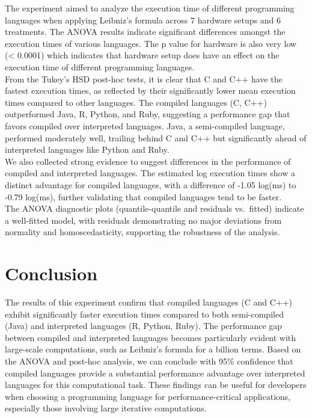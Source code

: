 \documentclass[12pt,halfline,a4paper,]{ouparticle}
\begin{document}
The experiment aimed to analyze the execution time of different
programming languages when applying Leibniz's formula across 7 hardware
setups and 6 treatments. The ANOVA results indicate significant
differences amongst the execution times of various languages. The p
value for hardware is also very low (\textless{} 0.0001) which indicates
that hardware setup does have an effect on the execution time of
different programming languages.\\
From the Tukey's HSD post-hoc tests, it is clear that C and C++ have the
fastest execution times, as reflected by their significantly lower mean
execution times compared to other languages. The compiled languages (C,
C++) outperformed Java, R, Python, and Ruby, suggesting a performance
gap that favors compiled over interpreted languages. Java, a
semi-compiled language, performed moderately well, trailing behind C and
C++ but significantly ahead of interpreted languages like Python and
Ruby.\\
We also collected strong evidence to suggest differences in the
performance of compiled and interpreted languages. The estimated log
execution times show a distinct advantage for compiled languages, with a
difference of -1.05 log(ms) to -0.79 log(ms), further validating that
compiled languages tend to be faster.\\
The ANOVA diagnostic plots (quantile-quantile and residuals vs.~fitted)
indicate a well-fitted model, with residuals demonstrating no major
deviations from normality and homoscedasticity, supporting the
robustness of the analysis.\\

\hypertarget{conclusion}{%
\section{Conclusion}\label{conclusion}}

The results of this experiment confirm that compiled languages (C and
C++) exhibit significantly faster execution times compared to both
semi-compiled (Java) and interpreted languages (R, Python, Ruby). The
performance gap between compiled and interpreted languages becomes
particularly evident with large-scale computations, such as Leibniz's
formula for a billion terms. Based on the ANOVA and post-hoc analysis,
we can conclude with 95\% confidence that compiled languages provide a
substantial performance advantage over interpreted languages for this
computational task. These findings can be useful for developers when
choosing a programming language for performance-critical applications,
especially those involving large iterative computations.
\end{document}
